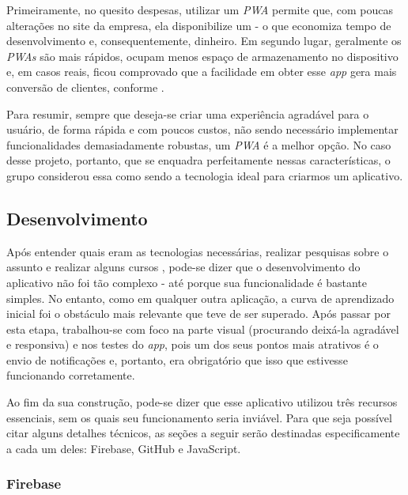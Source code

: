 Primeiramente, no quesito despesas, utilizar um \textit{PWA} permite que, com poucas alterações no site da empresa, ela disponibilize um  - o que economiza tempo de desenvolvimento e, consequentemente, dinheiro. Em segundo lugar, geralmente os \textit{PWAs} são mais rápidos, ocupam menos espaço de armazenamento no dispositivo e, em casos reais, ficou comprovado que a facilidade em obter esse \textit{app} gera mais conversão de clientes, conforme \cite{Souza19} .

Para resumir, sempre que deseja-se criar uma experiência agradável para o usuário, de forma rápida e com poucos custos, não sendo necessário implementar funcionalidades demasiadamente robustas, um \textit{PWA} é a melhor opção. No caso desse projeto, portanto, que se enquadra perfeitamente nessas características, o grupo considerou essa como sendo a tecnologia ideal para criarmos um aplicativo.


\subsection{Desenvolvimento}
\label{subsec:desenvolvimento}

Após entender quais eram as tecnologias necessárias, realizar pesquisas sobre o assunto e realizar alguns cursos \online{}, pode-se dizer que o desenvolvimento do aplicativo não foi tão complexo - até porque sua funcionalidade é bastante simples. No entanto, como em qualquer outra aplicação, a curva de aprendizado inicial foi o obstáculo mais relevante que teve de ser superado. Após passar por esta etapa, trabalhou-se com foco na parte visual (procurando deixá-la agradável e responsiva) e nos testes do \textit{app}, pois um dos seus pontos mais atrativos é o envio de notificações e, portanto, era obrigatório que isso que estivesse funcionando corretamente. 

Ao fim da sua construção, pode-se dizer que esse aplicativo utilizou três recursos essenciais, sem os quais seu funcionamento seria inviável. Para que seja possível citar alguns detalhes técnicos, as seções a seguir serão destinadas especificamente a cada um deles: Firebase, GitHub e JavaScript.

\subsubsection{Firebase}
\label{subsubsec:firebase}

